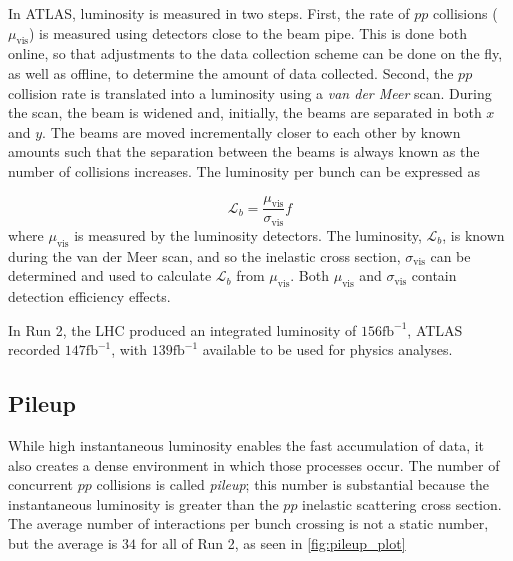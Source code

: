 

In \ac{ATLAS}, luminosity is measured in two steps. First, the rate of $pp$ collisions ($\mu_{\textrm{vis}}$) is measured using detectors close to the beam pipe. This is done both online, so that adjustments to the data collection scheme can be done on the fly, as well as offline, to determine the amount of data collected. Second, the $pp$ collision rate is translated into a luminosity using a \emph{van der Meer} scan. During the scan, the beam is widened and, initially, the beams are separated in both $x$ and $y$. The beams are moved incrementally closer to each other by known amounts such that the separation between the beams is always known as the number of collisions increases. The luminosity per bunch can be expressed as

\begin{equation}
\mathcal{L}_b = \frac{\mu_{\textrm{vis}}}{\sigma_{\textrm{vis}}} f
\end{equation}
where $\mu_{\textrm{vis}}$ is measured by the luminosity detectors. The luminosity, $\mathcal{L}_b$, is known during the van der Meer scan, and so the inelastic cross section, $\sigma_{\textrm{vis}}$ can be determined and used to calculate $\mathcal{L}_b$ from $\mu_{\textrm{vis}}$. Both $\mu_{\textrm{vis}}$ and $\sigma_{\textrm{vis}}$ contain detection efficiency effects. 

In Run 2, the \ac{LHC} produced an integrated luminosity of $156 \textrm{fb}^{-1}$, \ac{ATLAS} recorded $147 \textrm{fb}^{-1}$, with $139 \textrm{fb}^{-1}$ available to be used for physics analyses.



\subsection{Pileup}

While high instantaneous luminosity enables the fast accumulation of data, it also creates a dense environment in which those processes occur. The number of concurrent $pp$ collisions is called \emph{pileup}; this number is substantial because the instantaneous luminosity is greater than the $pp$ inelastic scattering cross section. The average number of interactions per bunch crossing is not a static number, but the average is $34$ for all of Run 2, as seen in \autoref{fig:pileup_plot}

